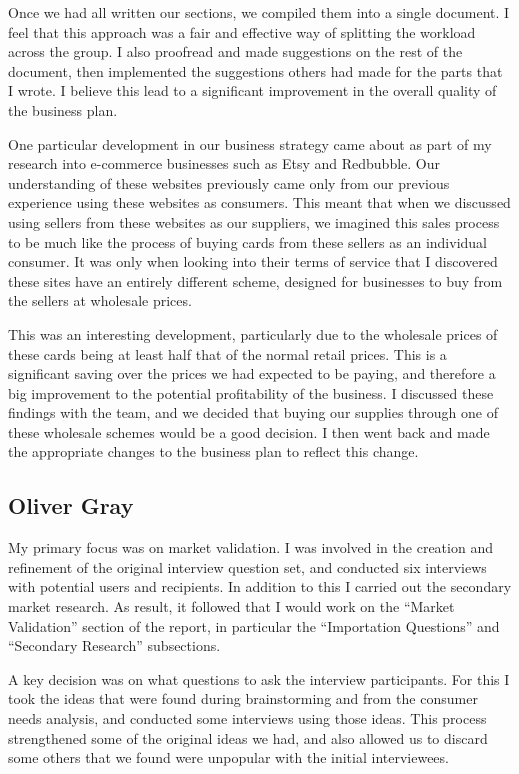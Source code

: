 \documentclass[10pt,a4paper]{article}
\begin{document}
\begin{appendices}
Once we had all written our sections, we compiled them into a single document. I feel that this approach was a fair and effective way of splitting the workload across the group. I also proofread and made suggestions on the rest of the document, then implemented the suggestions others had made for the parts that I wrote. I believe this lead to a significant improvement in the overall quality of the business plan.

One particular development in our business strategy came about as part of my research into e-commerce businesses such as Etsy and Redbubble. Our understanding of these websites previously came only from our previous experience using these websites as consumers. This meant that when we discussed using sellers from these websites as our suppliers, we imagined this sales process to be much like the process of buying cards from these sellers as an individual consumer. It was only when looking into their terms of service that I discovered these sites have an entirely different scheme, designed for businesses to buy from the sellers at wholesale prices.

This was an interesting development, particularly due to the wholesale prices of these cards being at least half that of the normal retail prices. This is a significant saving over the prices we had expected to be paying, and therefore a big improvement to the potential profitability of the business. I discussed these findings with the team, and we decided that buying our supplies through one of these wholesale schemes would be a good decision. I then went back and made the appropriate changes to the business plan to reflect this change.
\clearpage
\subsection{Oliver Gray}\label{subsec:oliverGray}
My primary focus was on market validation. I was involved in the creation and refinement of the original interview question set, and conducted six interviews with potential users and recipients. In addition to this I carried out the secondary market research. As result, it followed that I would work on the ``Market Validation'' section of the report, in particular the ``Importation Questions'' and ``Secondary Research'' subsections.

A key decision was on what questions to ask the interview participants. For this I took the ideas that were found during brainstorming and from the consumer needs analysis, and conducted some interviews using those ideas. This process strengthened some of the original ideas we had, and also allowed us to discard some others that we found were unpopular with the initial interviewees.


\end{appendices}
\end{document}
